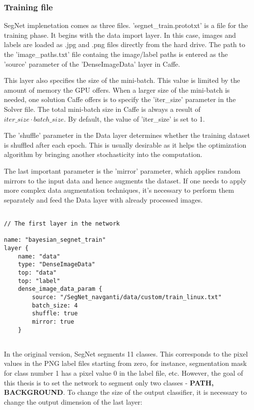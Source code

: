 \subsubsection{Training file}

SegNet implenetation comes as three files. 'segnet\_train.prototxt' is a file for the training phase. It begins with the data import layer. In this case, images and labels are loaded as .jpg and .png files directly from the hard drive. The path to the 'image\_paths.txt' file containg the image/label paths is entered as the 'source' parameter of the 'DenseImageData' layer in Caffe.

This layer also specifies the size of the mini-batch. This value is limited by the amount of memory the GPU offers. When a larger size of the mini-batch is needed, one solution Caffe offers is to specify the 'iter\_size' parameter in the Solver file. The total mini-batch size in Caffe is always a result of $iter\_size \cdot batch\_size$. By default, the value of 'iter\_size' is set to 1.

The 'shuffle' parameter in the Data layer determines whether the training dataset is shuffled after each epoch. This is usually desirable as it helps the optimization algorithm by bringing another stochasticity into the computation. 

The last important parameter is the 'mirror' parameter, which applies random mirrors to the input data and hence augments the dataset. If one needs to apply more complex data augmentation techniques, it's necessary to perform them separately and feed the Data layer with already processed images.  

\begin{lstlisting}

// The first layer in the network

name: "bayesian_segnet_train"
layer {
	name: "data"
	type: "DenseImageData"
	top: "data"
	top: "label"
	dense_image_data_param {
		source: "/SegNet_navganti/data/custom/train_linux.txt"
		batch_size: 4   			    			
		shuffle: true
		mirror: true	
	}
	
\end{lstlisting}	 

In the original version, SegNet segments 11 classes. This corresponds to the pixel values in the PNG label files starting from zero, for instance, segmentation mask for class number 1 has a pixel value 0 in the label file, etc. However, the goal of this thesis is to set the network to segment only two classes - \textbf{PATH, BACKGROUND}. To change the size of the output classifier, it is necessary to change the output dimension of the last layer:

